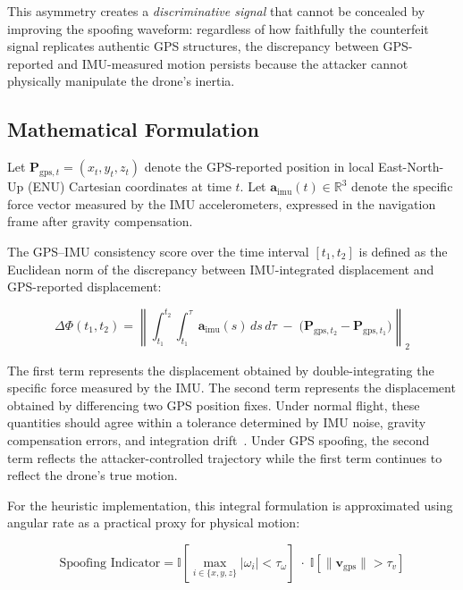 This asymmetry creates a \textit{discriminative signal} that cannot be concealed by improving the spoofing waveform: regardless of how faithfully the counterfeit signal replicates authentic GPS structures, the discrepancy between GPS-reported and IMU-measured motion persists because the attacker cannot physically manipulate the drone's inertia.

\subsection{Mathematical Formulation}

Let \(\mathbf{P}_{\text{gps}, t} = (x_t, y_t, z_t)\) denote the GPS-reported position in local East-North-Up (ENU) Cartesian coordinates at time \(t\). Let \(\mathbf{a}_{\text{imu}}(t) \in \mathbb{R}^3\) denote the specific force vector measured by the IMU accelerometers, expressed in the navigation frame after gravity compensation.

The GPS--IMU consistency score over the time interval \([t_1, t_2]\) is defined as the Euclidean norm of the discrepancy between IMU-integrated displacement and GPS-reported displacement:

\begin{equation}
    \Delta \Phi(t_1, t_2) =
    \left\| \int_{t_1}^{t_2} \int_{t_1}^{\tau} \mathbf{a}_{\text{imu}}(s) \, ds \, d\tau
    \;-\; \bigl( \mathbf{P}_{\text{gps}, t_2} - \mathbf{P}_{\text{gps}, t_1} \bigr) \right\|_2
    \label{eq:delta_phi_full}
\end{equation}

The first term represents the displacement obtained by double-integrating the specific force measured by the IMU. The second term represents the displacement obtained by differencing two GPS position fixes. Under normal flight, these quantities should agree within a tolerance determined by IMU noise, gravity compensation errors, and integration drift~\cite{Hassan2023}. Under GPS spoofing, the second term reflects the attacker-controlled trajectory while the first term continues to reflect the drone's true motion.

For the heuristic implementation, this integral formulation is approximated using angular rate as a practical proxy for physical motion:

\begin{equation}
    \text{Spoofing Indicator} = \mathbb{I} \left[ \max_{i \in \{x,y,z\}} |\omega_i| < \tau_{\omega} \right]
    \;\cdot\; \mathbb{I} \left[ \| \mathbf{v}_{\text{gps}} \| > \tau_{v} \right]
    \label{eq:spoof_indicator}
\end{equation}

